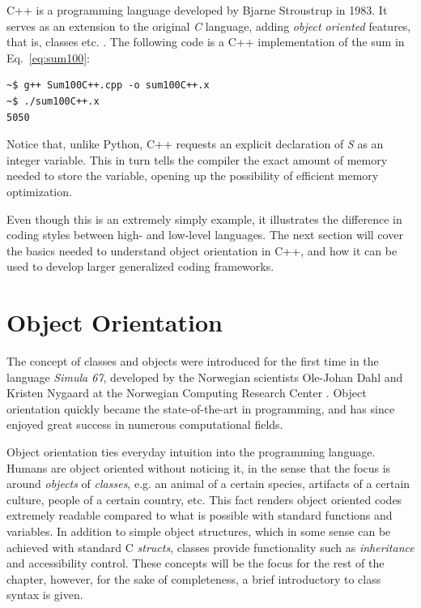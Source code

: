 C++ is a programming language developed by Bjarne Stroustrup in 1983. It serves as an extension to the original \textit{C} language, adding \textit{object oriented} features, that is, classes etc. \cite{ORegan}. The following code is a C++ implementation of the sum in Eq.~\ref{eq:sum100}:

\vspace{0.5 cm}


\begin{verbatim}
~$ g++ Sum100C++.cpp -o sum100C++.x
~$ ./sum100C++.x 
5050
\end{verbatim}


Notice that, unlike Python, C++ requests an explicit declaration of \textit{S} as an integer variable. This in turn tells the compiler the exact amount of memory needed to store the variable, opening up the possibility of efficient memory optimization. 

Even though this is an extremely simply example, it illustrates the difference in coding styles between high- and low-level languages. The next section will cover the basics needed to understand object orientation in C++, and how it can be used to develop larger generalized coding frameworks.

\section{Object Orientation}
\label{sec:OO}

The concept of classes and objects were introduced for the first time in the language \textit{Simula 67}, developed by the Norwegian scientists Ole-Johan Dahl and Kristen Nygaard at the Norwegian Computing Research Center \cite{ORegan}. Object orientation quickly became the state-of-the-art in programming, and has since enjoyed great success in numerous computational fields. 

Object orientation ties everyday intuition into the programming language. Humans are object oriented without noticing it, in the sense that the focus is around \textit{objects} of \textit{classes}, e.g. an animal of a certain species, artifacts of a certain culture, people of a certain country, etc. This fact renders object oriented codes extremely readable compared to what is possible with standard functions and variables. In addition to simple object structures, which in some sense can be achieved with standard C \textit{structs}, classes provide functionality such as \textit{inheritance} and accessibility control. These concepts will be the focus for the rest of the chapter, however, for the sake of completeness, a brief introductory to class syntax is given.

